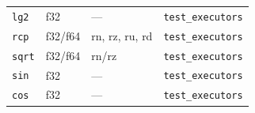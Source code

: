 \begin{longtable}{p{4cm} p{5cm} p{2cm} p{3.5cm}}
  \texttt{lg2}       & f32             & ---  & \texttt{test\_executors} \\
  \texttt{rcp}       & f32/f64         & rn, rz, ru, rd & \texttt{test\_executors} \\
  \texttt{sqrt}      & f32/f64         & rn/rz       & \texttt{test\_executors} \\
  \texttt{sin}       & f32             & ---         & \texttt{test\_executors} \\
  \texttt{cos}       & f32             & ---         & \texttt{test\_executors} \\
\end{longtable}

